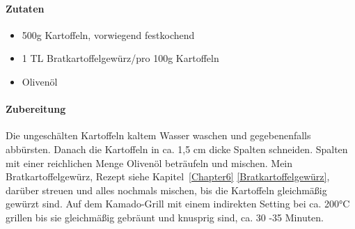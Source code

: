 \paragraph{Zutaten}

\begin{itemize}[noitemsep]
	\item 500g Kartoffeln, vorwiegend festkochend
	\item 1 TL Bratkartoffelgewürz/pro 100g Kartoffeln
	\item Olivenöl
\end{itemize}

\paragraph{Zubereitung}

Die ungeschälten Kartoffeln kaltem Wasser waschen und gegebenenfalls abbürsten. Danach die Kartoffeln in ca. 1,5 cm dicke Spalten schneiden. Spalten mit einer reichlichen Menge Olivenöl beträufeln und mischen. Mein Bratkartoffelgewürz, Rezept siehe Kapitel~\ref{Chapter6} \vref{Bratkartoffelgewürz}, darüber streuen und alles nochmals mischen, bis die Kartoffeln gleichmäßig gewürzt sind. Auf dem Kamado-Grill mit einem indirekten Setting bei ca. 200°C grillen bis sie gleichmäßig gebräunt und knusprig sind, ca. 30 -35 Minuten.
